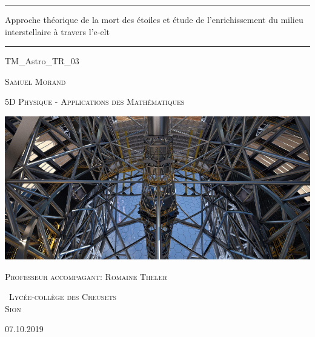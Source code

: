 \documentclass[11pt,a4paper,twoside]{report}
\begin{document}
\begin{titlepage} 
	
	\centering 
	
	\scshape 
	
	\vspace*{\baselineskip}
	
	\rule{\textwidth}{0.4pt} 
	
	\vspace{0.75\baselineskip} 
	
	{\LARGE Approche théorique de la mort des étoiles et étude de l'enrichissement du milieu interstellaire à travers l'e-elt} 
	
	\vspace{0.75\baselineskip} 
	
	\rule{\textwidth}{0.4pt}\vspace*{-\baselineskip}\vspace{3.2pt} 
	
	\vspace{2.5\baselineskip} 
	
	TM\_Astro\_TR\_03
	
	\vspace*{2.5\baselineskip} 
	
	{\scshape\Large Samuel Morand \\}
	
	\vspace{0.75\baselineskip} 

	{\scshape\Large 5D Physique - Applications des Mathématiques\\}

	\vspace*{4\baselineskip}
	
	\includegraphics[scale=1]{images/e-elt}

	\vspace*{4\baselineskip}
	
	{\scshape\Large Professeur accompagant: Romaine Theler\\}
	
	\vspace*{3\baselineskip}
	
	{\scshape\ Lycée-collège des Creusets \\ Sion} 
	
	\vfill 
	
	07.10.2019

\end{titlepage}
\end{document}
